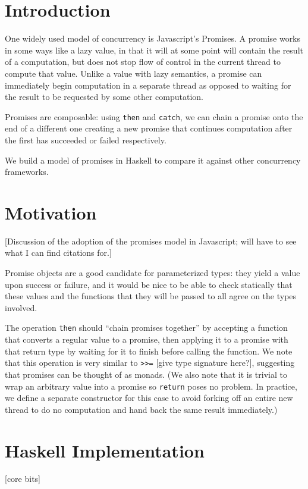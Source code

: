 \documentclass[sigplan,screen,review]{acmart}
\begin{document}
\section{Introduction}
One widely used model of concurrency is Javascript's Promises.  A promise works in some ways like a lazy value, in that it will at some point will contain the result of a computation, but does not stop flow of control in the current thread to compute that value.  Unlike a value with lazy semantics, a promise can immediately begin computation in a separate thread as opposed to waiting for the result to be requested by some other computation.

Promises are composable: using \lstinline{then} and \lstinline{catch}, we can chain a promise onto the end of a different one creating a new promise that continues computation after the first has succeeded or failed respectively.

We build a model of promises in Haskell to compare it against other concurrency frameworks.
\section{Motivation}
[Discussion of the adoption of the promises model in Javascript; will have to see what I can find citations for.]

Promise objects are a good candidate for parameterized types: they yield a value upon success or failure, and it would be nice to be able to check statically that these values and the functions that they will be passed to all agree on the types involved.

The operation \lstinline{then} should ``chain promises together'' by accepting a function that converts a regular value to a promise, then applying it to a promise with that return type by waiting for it to finish before calling the function.  We note that this operation is very similar to \lstinline{>>=} [give type signature here?], suggesting that promises can be thought of as monads.  (We also note that it is trivial to wrap an arbitrary value into a promise so \lstinline{return} poses no problem.  In practice, we define a separate constructor for this case to avoid forking off an entire new thread to do no computation and hand back the same result immediately.)
\section{Haskell Implementation}

[core bits]
\end{document}
